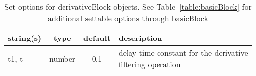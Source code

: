 \begin{table}[ht]
\centering
\begin{tabular}{p{5cm} c c p{7cm}}
\hline
string(s) & type & default & description \\
\hline
t1, t & number & 0.1 & delay time constant for the derivative filtering operation\\
\hline
\end{tabular}
\caption{Set options for derivativeBlock objects. See Table~\ref{table:basicBlock} for additional settable options through basicBlock}
\label{table:derivativeBlock}
\end{table}
